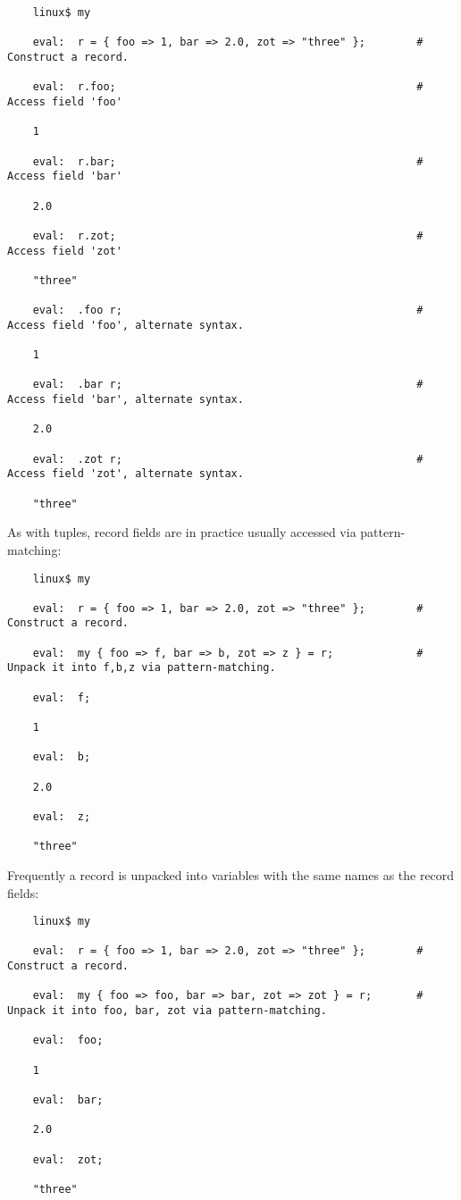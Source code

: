 \begin{verbatim}
    linux$ my

    eval:  r = { foo => 1, bar => 2.0, zot => "three" };        # Construct a record.

    eval:  r.foo;                                               # Access field 'foo'

    1

    eval:  r.bar;                                               # Access field 'bar'

    2.0

    eval:  r.zot;                                               # Access field 'zot'

    "three"

    eval:  .foo r;                                              # Access field 'foo', alternate syntax.

    1

    eval:  .bar r;                                              # Access field 'bar', alternate syntax.

    2.0

    eval:  .zot r;                                              # Access field 'zot', alternate syntax.

    "three"
\end{verbatim}

As with tuples, record fields are in practice usually accessed 
via pattern-matching:

\begin{verbatim}
    linux$ my

    eval:  r = { foo => 1, bar => 2.0, zot => "three" };        # Construct a record.

    eval:  my { foo => f, bar => b, zot => z } = r;             # Unpack it into f,b,z via pattern-matching.

    eval:  f;

    1

    eval:  b;

    2.0

    eval:  z;

    "three"
\end{verbatim}

Frequently a record is unpacked into variables with the same 
names as the record fields:

\begin{verbatim}
    linux$ my

    eval:  r = { foo => 1, bar => 2.0, zot => "three" };        # Construct a record.

    eval:  my { foo => foo, bar => bar, zot => zot } = r;       # Unpack it into foo, bar, zot via pattern-matching.

    eval:  foo;

    1

    eval:  bar;

    2.0

    eval:  zot;

    "three"

\end{verbatim}

